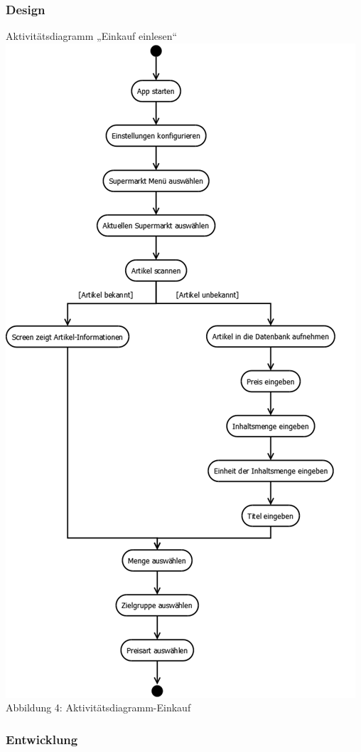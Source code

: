 \documentclass[12pt,a4paper]{article}
\begin{document}
\subsubsection{Design}
Aktivitätsdiagramm „Einkauf einlesen“ 
\\
\includegraphics[scale=0.6, origin=l]{Aktivitaets-Diagramm.png}
\\
\footnotesize Abbildung 4: Aktivitätsdiagramm-Einkauf
\normalsize
\subsubsection*{Entwicklung}
\newpage
\end{document}
